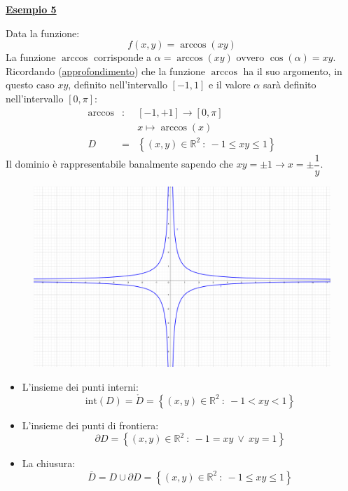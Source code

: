 \documentclass[a4paper]{article}
\newcommand{\example}[1]{\textcolor{Green4}{\textbf{#1}}}
\begin{document}
	\begin{flushleft}
		\example{\underline{Esempio 5}}
	\end{flushleft}

	\noindent
	Data la funzione:
	\begin{equation*}
		f\left(x,y\right) = \arccos\left(xy\right)
	\end{equation*}
	La funzione $\arccos$ corrisponde a $\alpha = \arccos\left(xy\right)$ ovvero $\cos\left(\alpha\right) = xy$. Ricordando (\href{https://www.youmath.it/lezioni/analisi-matematica/le-funzioni-elementari-e-le-loro-proprieta/376-arcocoseno.html}{approfondimento}) che la funzione $\arccos$ ha il suo argomento, in questo caso $xy$, definito nell'intervallo $\left[-1, 1\right]$ e il valore $\alpha$ sarà definito nell'intervallo $\left[0,\pi\right]$:
	\begin{equation*}
		\begin{array}{rcl}
			\arccos &:& \left[-1, +1\right] \rightarrow \left[0,\pi\right] \\ [.5em]
			&& x \mapsto \arccos\left(x\right) \\ [.5em]
			D &=& \left\{\left(x,y\right) \in \mathbb{R}^{2} \: : \: -1 \le xy \le 1\right\}
		\end{array}
	\end{equation*}
	Il dominio è rappresentabile banalmente sapendo che $xy = \pm 1 \rightarrow x = \pm \dfrac{1}{y}$.
	\begin{figure}[!htp]
		\centering
		\includegraphics[width=.7\textwidth]{img/dominio_di_funzioni-5.pdf}
	\end{figure}
	\begin{itemize}
		\item L'insieme dei punti interni:
		\begin{equation*}
			\mathrm{int}\left(D\right) = \mathring{D} = \left\{\left(x,y\right) \in \mathbb{R}^{2} \: : \: -1 < xy < 1\right\}
		\end{equation*}

		\item L'insieme dei punti di frontiera:
		\begin{equation*}
			\partial D = \left\{\left(x,y\right) \in \mathbb{R}^{2} \: : \: -1 = xy \: \lor \: xy = 1\right\}
		\end{equation*}

		\item La chiusura:
		\begin{equation*}
			\overline{D} = D \cup \partial D = \left\{\left(x,y\right) \in \mathbb{R}^{2} \: : \: -1 \le xy \le 1\right\}
		\end{equation*}
	\end{itemize}
\end{document}
